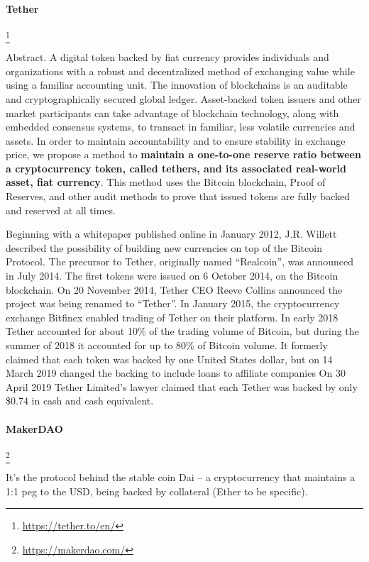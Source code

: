 \paragraph{Tether}\footnote{\url{https://tether.to/en/}}

Abstract. A digital token backed by fiat currency provides individuals and organizations with a robust and decentralized method of exchanging value while using a familiar accounting unit. The innovation of blockchains is an auditable and cryptographically secured global ledger. Asset-backed token issuers and other market participants can take advantage of blockchain technology, along with embedded consensus systems, to transact in familiar, less volatile currencies and assets. In order to maintain accountability and to ensure stability in exchange price, we propose a method to \textbf{maintain a one-to-one reserve ratio between a cryptocurrency token, called tethers, and its associated real-world asset, fiat currency}. This method uses the Bitcoin blockchain, Proof of Reserves, and other audit methods to prove that issued tokens are fully backed and reserved at all times.

Beginning with a whitepaper published online in January 2012, J.R. Willett described the possibility of building new currencies on top of the Bitcoin Protocol.
The precursor to Tether, originally named ``Realcoin'', was announced in July 2014. The first tokens were issued on 6 October 2014, on the Bitcoin blockchain.
On 20 November 2014, Tether CEO Reeve Collins announced the project was being renamed to ``Tether''.
In January 2015, the cryptocurrency exchange Bitfinex enabled trading of Tether on their platform.
In early 2018 Tether accounted for about 10\% of the trading volume of Bitcoin, but during the summer of 2018 it accounted for up to 80\% of Bitcoin volume.
It formerly claimed that each token was backed by one United States dollar, but on 14 March 2019 changed the backing to include loans to affiliate companies
On 30 April 2019 Tether Limited's lawyer claimed that each Tether was backed by only \$0.74 in cash and cash equivalent.

\paragraph{MakerDAO}\footnote{\url{https://makerdao.com/}}

It's the protocol behind the stable coin Dai -- a cryptocurrency that maintains a 1:1 peg to the USD, being backed by collateral (Ether to be specific).

